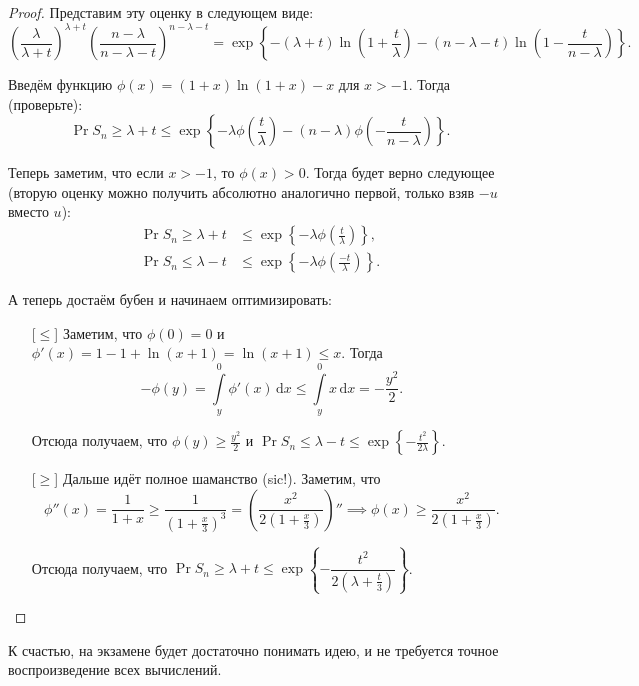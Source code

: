 \begin{proof}
    Представим эту оценку в следующем виде:
    \[\left(\frac{\lambda}{\lambda + t}\right)^{\lambda + t}\left(\frac{n - \lambda}{n - \lambda - t}\right)^{n - \lambda - t} = \exp\left\{-(\lambda + t)\ln\left(1 + \frac{t}{\lambda}\right) - (n - \lambda - t)\ln\left(1 - \frac{t}{n - \lambda}\right)\right\}.\]
    
    Введём функцию \(\phi(x) = (1 + x)\ln(1 + x) - x\) для \(x > -1\). Тогда (проверьте):
    \[\Pr{S_n \geq \lambda + t} \leq \exp\left\{-\lambda\phi\left(\frac{t}{\lambda}\right) - (n - \lambda)\phi\left(-\frac{t}{n - \lambda}\right)\right\}.\]
    
    Теперь заметим, что если \(x > -1\), то \(\phi(x) > 0\). Тогда будет верно следующее (вторую оценку можно получить абсолютно аналогично первой, только взяв \(-u\) вместо \(u\)):
    \[\begin{aligned}
    \Pr{S_n \geq \lambda + t} &\leq \exp\left\{-\lambda\phi\left(\frac{t}{\lambda}\right)\right\}, \\
    \Pr{S_n \leq \lambda - t} &\leq \exp\left\{-\lambda\phi\left(\frac{-t}{\lambda}\right)\right\}.
    \end{aligned}\]
    
    А теперь достаём бубен и начинаем оптимизировать:
    \begin{itemize}
        \item[{[\(\leq\)]}] Заметим, что \(\phi(0) = 0\) и \(\phi'(x) = 1 - 1 + \ln(x + 1) = \ln(x + 1) \leq x\). Тогда
        \[-\phi(y) = \int\limits_{y}^{0} \phi'(x)\,\mathrm{d}x \leq \int\limits_{y}^{0} x\,\mathrm{d}x = -\frac{y^2}{2}.\]
        
        Отсюда получаем, что \(\phi(y) \geq \frac{y^2}{2}\) и \(\Pr{S_n \leq \lambda - t} \leq \exp\left\{-\frac{t^2}{2\lambda}\right\}\).
        
        \item[{[\(\geq\)]}] Дальше идёт полное шаманство (sic!). Заметим, что 
        \[\phi''(x) = \frac{1}{1 + x} \geq \frac{1}{\left(1 + \frac{x}{3}\right)^3} = \left(\frac{x^2}{2\left(1 + \frac{x}{3}\right)}\right)'' \implies \phi(x) \geq \frac{x^2}{2\left(1 + \frac{x}{3}\right)}.\]
        
        Отсюда получаем, что \(\Pr{S_n \geq \lambda + t} \leq \exp\left\{-\dfrac{t^2}{2\left(\lambda + \frac{t}{3}\right)}\right\}\).
    \end{itemize}
\end{proof}

К счастью, на экзамене будет достаточно понимать идею, и не требуется точное воспроизведение всех 
вычислений.

